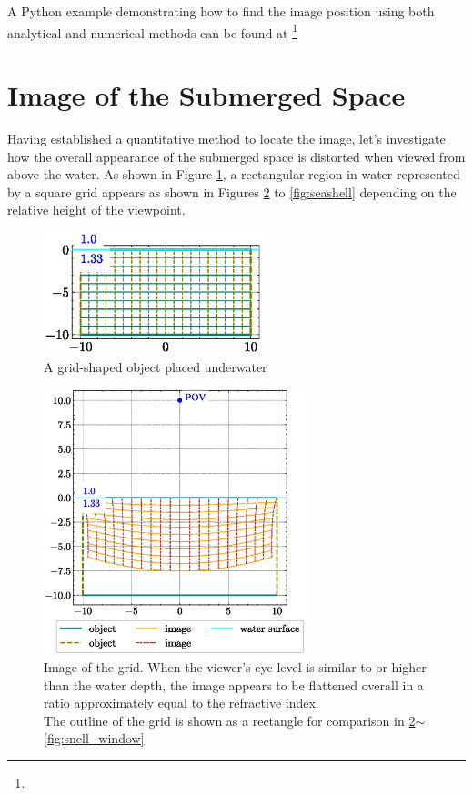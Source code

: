 \documentclass[twocolumn]{article}
\begin{document}
A Python example demonstrating how to find the image position using both analytical and numerical methods can be found at 
\href{https://github.com/mingshey/python_projects/blob/main/Refraction_Image.ipynb}%
{}\footnote{}

\section{Image of the Submerged Space}

Having established a quantitative method to locate the image, let's investigate how the overall appearance of the submerged space is distorted when viewed from above the water. As shown in Figure \ref{fig:grid_underwater}, a rectangular region in water represented by a square grid appears as shown in Figures \ref{fig:image_underwater} to \ref{fig:seashell} depending on the relative height of the viewpoint.

\begin{figure}
	\centering
	\includegraphics[width=2.5in]{figs/grid_underwater.eps}
	\caption{A grid-shaped object placed underwater}
	\label{fig:grid_underwater}
\end{figure}

\begin{figure}[!t]
	\centering
	\includegraphics[width=3in]{figs/image_underwater1.eps}
	\caption{Image of the grid. When the viewer's eye level is similar to or higher than the water depth, the image appears to be flattened overall in a ratio approximately equal to the refractive index.\\
	The outline of the grid is shown as a rectangle for comparison in \ref{fig:image_underwater}$\sim$\ref{fig:snell_window}}
	\label{fig:image_underwater}
\end{figure}
\end{document}
